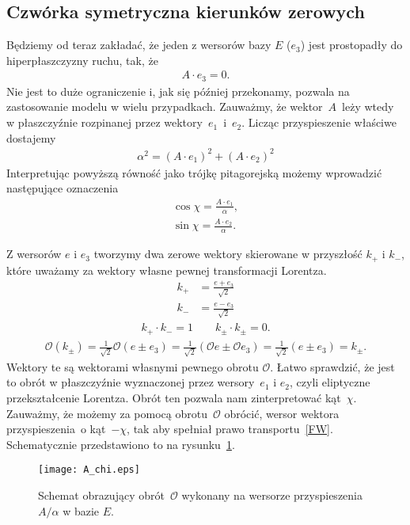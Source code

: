 \subsection{Czwórka symetryczna kierunków zerowych}
Będziemy od teraz zakładać, że jeden z wersorów bazy $E$ 
($e_3$) jest prostopadły do hiperpłaszczyzny ruchu, tak, że
\begin{align*}
A\cdot e_3 = 0.
\end{align*}
Nie jest to duże ograniczenie i, jak się później przekonamy, pozwala 
na zastosowanie modelu w wielu przypadkach.
Zauważmy, że wektor~$A$~leży wtedy w płaszczyźnie rozpinanej przez 
wektory~$e_1$~i~$e_2$. Licząc przyspieszenie właściwe dostajemy
\begin{align*}
\alpha^2 = (A\cdot e_1)^2 + (A\cdot e_2)^2
\end{align*}
Interpretując powyższą równość jako trójkę pitagorejską 
możemy wprowadzić następujące oznaczenia
\begin{align*}
\cos\chi = \frac{A\cdot e_1}{\alpha},\\
\sin\chi = \frac{A\cdot e_2}{\alpha}.
\end{align*}

Z wersorów $e$ i $e_3$ tworzymy dwa zerowe wektory skierowane 
w przyszłość $k_+$ i $k_-$, 
które uważamy za wektory własne pewnej transformacji Lorentza. 
\begin{align}
k_+ &= \frac{e+e_3}{\sqrt{2}} \\
k_- &= \frac{e-e_3}{\sqrt{2}} 
\end{align}
\begin{align*}
k_+\cdot k_- = 1 \qquad k_\pm\cdot k_\pm  = 0.
\end{align*}
\begin{align*}
\mathcal{O}( k_\pm ) = \frac{1}{\sqrt{2}} \mathcal{O} 
(e\pm e_3) =\frac{1}{\sqrt{2}} 
(\mathcal{O} e\pm \mathcal{O} e_3) =
\frac{1}{\sqrt{2}}  (e\pm e_3) = k_\pm.
\end{align*}
Wektory te są wektorami własnymi pewnego obrotu $\mathcal{O}$.
 Łatwo sprawdzić, że 
jest to obrót w płaszczyźnie wyznaczonej przez wersory~$e_1$ i $e_2$,
czyli eliptyczne przekształcenie Lorentza. 
Obrót ten pozwala nam zinterpretować kąt~$\chi$. 
Zauważmy, że możemy za pomocą obrotu~$\mathcal{O}$ obrócić, 
wersor wektora przyspieszenia~o kąt~$-\chi$, 
tak aby spełniał prawo transportu~\eqref{FW}. 
Schematycznie przedstawiono to na rysunku~\ref{A_chi_plot}.
\begin{figure}
\centering
\texttt{[image: A\_chi.eps]}
\caption{Schemat obrazujący obrót~$\mathcal{O}$ wykonany na wersorze 
przyspieszenia $A/\alpha$ w bazie $E$.}{\label{A_chi_plot}}
\end{figure}

